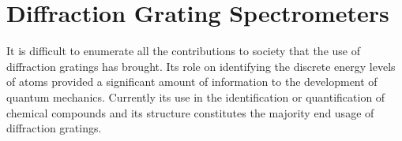 \documentclass[12pt,twoside,english]{book}
\renewcommand{\~}{\perispomeni}%
\numberwithin{equation}{section}
\numberwithin{figure}{section}
\newcommand\fnurl[2]{%
 \href{#2}{#1}\footnote{\url{#2}}%
}
\begin{document}
%
%
%
%
%
%
%
\chapter{Diffraction Grating Spectrometers}
It is difficult to enumerate all the contributions to society that the use of diffraction gratings has brought. Its role on identifying the discrete energy levels of atoms provided a significant amount of information to the development of quantum mechanics. Currently its use in the identification or quantification of chemical compounds and its structure constitutes the majority end usage of diffraction gratings.

\end{document}
